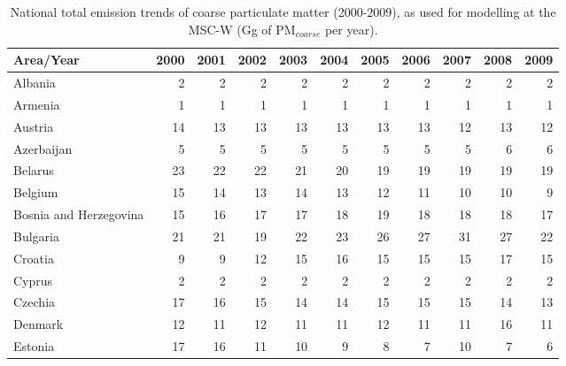  \begin{table}
 \caption{National total emission trends of coarse particulate matter (2000-2009), as used for modelling at the MSC-W (Gg of PM$_{coarse}$ per year).}
 
 \vspace{15pt}
 
 \scriptsize
 \centering
 \begin{tabular}{|l|r|r|r|r|r|r|r|r|r|r|}
 \hline
                     Area/Year&   2000&   2001&   2002&   2003&   2004&   2005&   2006&   2007&   2008&   2009\\\hline\hline
                       Albania&      2&      2&      2&      2&      2&      2&      2&      2&      2&      2\\\hline
                       Armenia&      1&      1&      1&      1&      1&      1&      1&      1&      1&      1\\\hline
                       Austria&     14&     13&     13&     13&     13&     13&     13&     12&     13&     12\\\hline
                    Azerbaijan&      5&      5&      5&      5&      5&      5&      5&      5&      6&      6\\\hline
                       Belarus&     23&     22&     22&     21&     20&     19&     19&     19&     19&     19\\\hline
                       Belgium&     15&     14&     13&     14&     13&     12&     11&     10&     10&      9\\\hline
        Bosnia and Herzegovina&     15&     16&     17&     17&     18&     19&     18&     18&     18&     17\\\hline
                      Bulgaria&     21&     21&     19&     22&     23&     26&     27&     31&     27&     22\\\hline
                       Croatia&      9&      9&     12&     15&     16&     15&     15&     15&     17&     15\\\hline
                        Cyprus&      2&      2&      2&      2&      2&      2&      2&      2&      2&      2\\\hline
                       Czechia&     17&     16&     15&     14&     14&     15&     15&     15&     14&     13\\\hline
                       Denmark&     12&     11&     12&     11&     11&     12&     11&     11&     16&     11\\\hline
                       Estonia&     17&     16&     11&     10&      9&      8&      7&     10&      7&      6\\\hline

\end{tabular}
\end{table}
